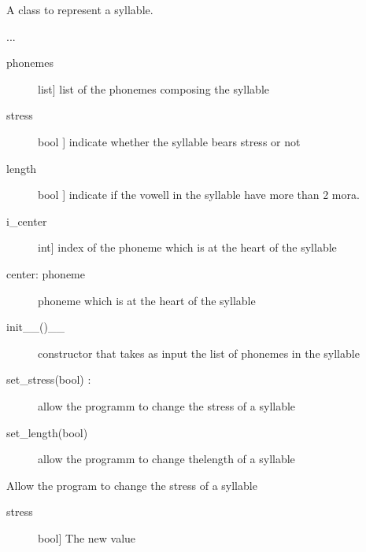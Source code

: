\documentclass[letterpaper,10pt,english]{sphinxmanual}
\begin{document}
\begin{fulllineitems}
\label{\detokenize{index:Word.Syllable}}
\sphinxAtStartPar
A class to represent a syllable.

\sphinxAtStartPar
...
\begin{description}
\item[{phonemes}] \leavevmode{[}list{]}
\sphinxAtStartPar
list of the phonemes composing the syllable

\item[{stress}] \leavevmode{[}bool {]}
\sphinxAtStartPar
indicate whether the syllable bears stress or not

\item[{length}] \leavevmode{[}bool {]}
\sphinxAtStartPar
indicate if the vowell in the syllable have more than 2 mora.

\item[{i\_center}] \leavevmode{[}int{]}
\sphinxAtStartPar
index of the phoneme which is at the heart of the syllable

\item[{center: phoneme}] \leavevmode{[}{]}
\sphinxAtStartPar
phoneme which is at the heart of the syllable

\end{description}
\begin{description}
\item[{init\_\_()\_\_}] \leavevmode
\sphinxAtStartPar
constructor that takes as input the list of phonemes in the syllable

\item[{set\_stress(bool) :}] \leavevmode
\sphinxAtStartPar
allow the programm to change the stress of a syllable

\item[{set\_length(bool)}] \leavevmode{[}{]}
\sphinxAtStartPar
allow the programm to change thelength of a syllable

\end{description}

\begin{fulllineitems}
\label{\detokenize{index:Word.Syllable.set_length}}
\sphinxAtStartPar
Allow the program to change the stress of a syllable
\begin{description}
\item[{stress}] \leavevmode{[}bool{]}
\sphinxAtStartPar
The new value


\end{description}
\end{fulllineitems}
\end{fulllineitems}
\end{document}
